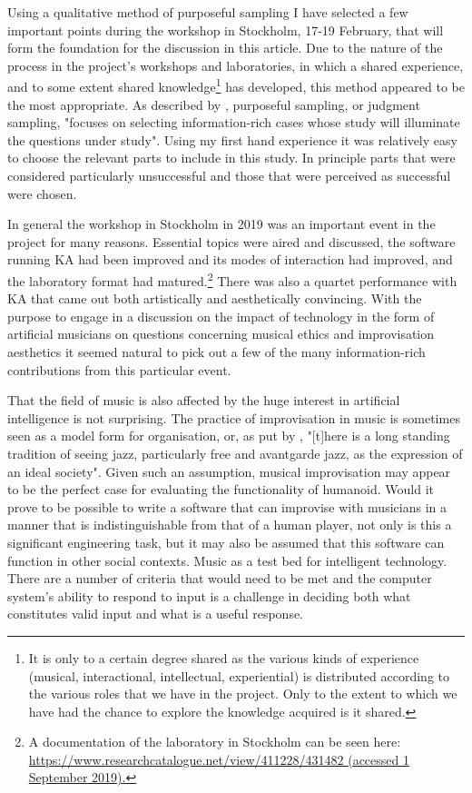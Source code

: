 \documentclass[11pt]{article}
\begin{document}
Using a qualitative method of purposeful sampling I have selected a
few important points during the workshop in Stockholm, 17-19 February,
that will form the foundation for the discussion in this article. Due
to the nature of the process in the project's workshops and
laboratories, in which a shared experience, and to some extent shared
knowledge\footnote{It is only to a certain degree shared as the
    various kinds of experience (musical, interactional, intellectual,
    experiential) is distributed according to the various roles that
    we have in the project. Only to the extent to which we have had
    the chance to explore the knowledge acquired is it shared.} has
developed, this method appeared to be the most appropriate. As
described by \citep[46]{Patton2002}, purposeful sampling, or judgment
sampling, "focuses on selecting information-rich cases whose study
will illuminate the questions under study". Using my first hand
experience it was relatively easy to choose the relevant parts to
include in this study. In principle parts that were considered
particularly unsuccessful and those that were perceived as successful
were chosen.

In general the workshop in Stockholm in 2019 was an important event in
the project for many reasons. Essential topics were aired and
discussed, the software running KA had been improved and its modes of
interaction had improved, and the laboratory format had
matured.\footnote{A documentation of the laboratory in Stockholm can
  be seen here:
  \url{https://www.researchcatalogue.net/view/411228/431482 (accessed
    1 September 2019).}} There was also a quartet performance with KA
that came out both artistically and aesthetically convincing. With the
purpose to engage in a discussion on the impact of technology in the
form of artificial musicians on questions concerning musical ethics
and improvisation aesthetics it seemed natural to pick out a few of
the many information-rich contributions from this particular event.

That the field of music is also affected by the huge interest in
artificial intelligence is not surprising. The practice of
improvisation in music is sometimes seen as a model form for
organisation, or, as put by \citet[59]{Cook2017}, "[t]here is a long
standing tradition of seeing jazz, particularly free and avantgarde
jazz, as the expression of an ideal society". Given such an
assumption, musical improvisation may appear to be the perfect case
for evaluating the functionality of humanoid. Would it prove to be
possible to write a software that can improvise with musicians in a
manner that is indistinguishable from that of a human player, not only
is this a significant engineering task, but it may also be assumed
that this software can function in other social contexts. Music as a
test bed for intelligent technology. There are a number of criteria
that would need to be met and the computer system's ability to respond
to input is a challenge in deciding both what constitutes valid input
and what is a useful response.
\end{document}
